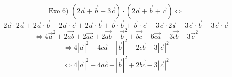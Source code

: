\documentclass{article}
\begin{document}
\[ \text{Exo 6) } (2\vec{a} + \vec{b} - 3\vec{c}) \cdot (2\vec{a} + \vec{b} + \vec{c}) \Leftrightarrow \]
\[ 2\vec{a} \cdot 2\vec{a} + 2\vec{a} \cdot \vec{b} + 2\vec{a} \cdot \vec{c} + 2\vec{a} \cdot \vec{b} + \vec{b} \cdot \vec{b} + \vec{b} \cdot \vec{c} - 3\vec{c} \cdot 2\vec{a} - 3\vec{c} \cdot \vec{b} - 3\vec{c} \cdot \vec{c} \]
\[ \Leftrightarrow 4\vec{a}^2 + 2\vec{ab} + 2\vec{ac} + 2\vec{ab} + \vec{b}^2 + \vec{bc} - 6\vec{ca} - 3\vec{cb} - 3\vec{c}^2 \]
\[ \Leftrightarrow 4|\vec{a}|^2 - 4\vec{ca} + |\vec{b}|^2 - 2\vec{cb} - 3|\vec{c}|^2 \]
\[ \Leftrightarrow 4|\vec{a}|^2 + 4\vec{ac} + |\vec{b}|^2 + 2\vec{bc} - 3|\vec{c}|^2 \]
\end{document}
